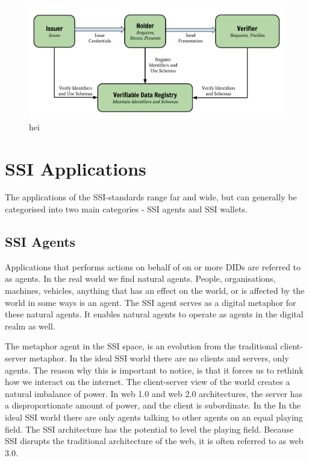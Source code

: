 \begin{figure}
\centering
\includegraphics{Introduction 99c57a51162f4f85bc7ec35261236693/hei}
\caption{hei}
\end{figure}

\hypertarget{ssi-applications}{%
\section{SSI Applications}\label{ssi-applications}}

The applications of the SSI-standards range far and wide, but can
generally be categorised into two main categories - SSI agents and SSI
wallets.

\hypertarget{ssi-agents}{%
\subsection{SSI Agents}\label{ssi-agents}}

Applications that performs actions on behalf of on or more DIDs are
referred to as agents. In the real world we find natural agents. People,
organisations, machines, vehicles, anything that has an effect on the
world, or is affected by the world in some ways is an agent. The SSI
agent serves as a digital metaphor for these natural agents. It enables
natural agents to operate as agents in the digital realm as well.

The metaphor agent in the SSI space, is an evolution from the
traditional client-server metaphor. In the ideal SSI world there are no
clients and servers, only agents. The reason why this is important to
notice, is that it forces us to rethink how we interact on the internet.
The client-server view of the world creates a natural imbalance of
power. In web 1.0 and web 2.0 architectures, the server has a
disproportionate amount of power, and the client is subordinate. In the
In the ideal SSI world there are only agents talking to other agents on
an equal playing field. The SSI architecture has the potential to level
the playing field. Because SSI disrupts the traditional architecture of
the web, it is often referred to as web 3.0.

